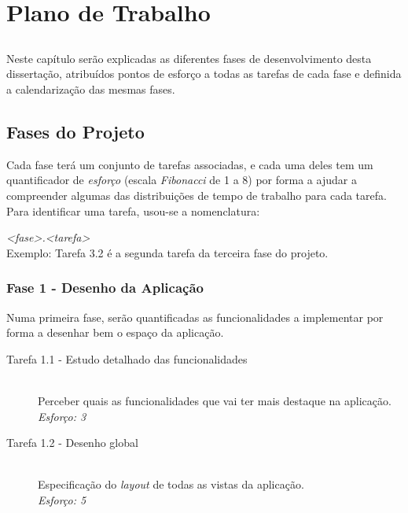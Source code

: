 
\chapter{Plano de Trabalho}\label{chap:chap4}

\section*{}

  Neste capítulo serão explicadas as diferentes fases de desenvolvimento desta dissertação, atribuídos pontos de esforço a todas as tarefas de cada fase e definida a calendarização das mesmas fases.

\section{Fases do Projeto} %
\label{sec:fases_projeto}


  Cada fase terá um conjunto de tarefas associadas, e cada uma deles tem um quantificador de \emph{esforço} (escala \emph{Fibonacci} de 1 a 8) por forma a ajudar a compreender algumas das distribuições de tempo de trabalho para cada tarefa.
  Para identificar uma tarefa, usou-se a nomenclatura:


  \emph{<fase>.<tarefa>} \\

  Exemplo: Tarefa 3.2 é a segunda tarefa da terceira fase do projeto.

  \subsection{Fase 1 - Desenho da Aplicação} %
  \label{sub:dev_desenho}
  
    Numa primeira fase, serão quantificadas as funcionalidades a implementar por forma a desenhar bem o espaço da aplicação.

    \begin{description}
      \item[Tarefa 1.1 - Estudo detalhado das funcionalidades] \hfill \\
      Perceber quais as funcionalidades que vai ter mais destaque na aplicação. \\
      \emph{Esforço: 3}

      \item[Tarefa 1.2 - Desenho global] \hfill \\
      Especificação do \emph{layout} de todas as vistas da aplicação. \\
      \emph{Esforço: 5}

    \end{description}

